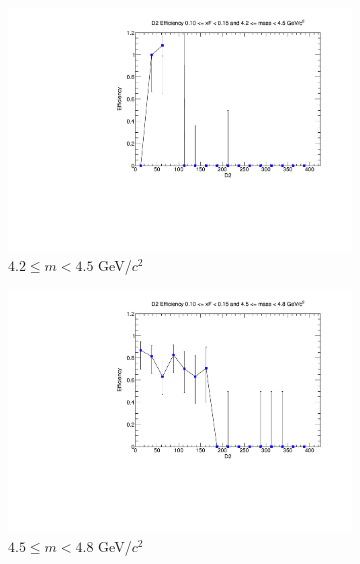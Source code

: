 \documentclass[11pt]{article}
\begin{document}
\begin{figure}[p]
    \centering
    \begin{subfigure}[b]{0.32\textwidth}
        \centering
        \includegraphics[width=\textwidth]{./kTrackerEfficiencyPlots/D2_Efficiency_xF2_mass0.pdf}
        \caption{$4.2 \leq m < 4.5$ GeV/$c^2$}
    \end{subfigure}\hfill
    \begin{subfigure}[b]{0.32\textwidth}
        \centering
        \includegraphics[width=\textwidth]{./kTrackerEfficiencyPlots/D2_Efficiency_xF2_mass1.pdf}
        \caption{$4.5 \leq m < 4.8$ GeV/$c^2$}
    \end{subfigure}\hfill
    \begin{subfigure}[b]{0.32\textwidth}
        \centering

\end{subfigure}
\end{figure}
\end{document}
